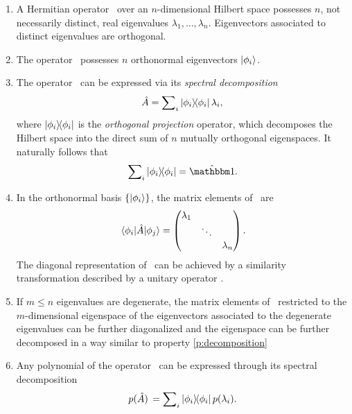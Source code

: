             \begin{enumerate}[label = \textit{\roman{enumi}}.]
                \item A Hermitian operator \hA\ over an $n$-dimensional Hilbert space possesses $n$, not necessarily distinct, real eigenvalues $\lambda_1,\ldots,\lambda_n$. Eigenvectors associated to distinct eigenvalues are orthogonal.
                \item The operator \hA\ possesses $n$ orthonormal eigenvectors $\ket{\phi_i}$.
                \item The operator \hA\ can be expressed via its \emph{spectral decomposition}
                    \begin{equation}
                        \label{eq:spectral-decomposition}
                        \hA = \sum\nolimits_i \dyad{\phi_i}{\phi_i}\lambda_i
                        \mycomma
                    \end{equation}
                    where $\dyad{\phi_i}{\phi_i}$ is the \emph{orthogonal projection} operator, which decomposes the Hilbert space into the direct sum of $n$ mutually orthogonal eigenspaces. It naturally follows that
                    \begin{equation}
                        \label{eq:completeness-of-identity}
                        \sum\nolimits_i \dyad{\phi_i}{\phi_i} = \hidM
                        \myperiod
                    \end{equation}
                    \label{p:decomposition}
                \item In the orthonormal basis $\qty{\ket{\phi_i}}$, the matrix elements of \hA\ are
                    \begin{equation*}
                        \mel{\phi_i}{\hA}{\phi_j} = \pmqty{\dmat{\lambda_1,\ddots,\lambda_n}}
                        \myperiod
                    \end{equation*}
                    The diagonal representation of \hA\ can be achieved by a similarity transformation described by a unitary operator \hU.
                \item If $m \leq n$ eigenvalues are degenerate, the matrix elements of \hA\ restricted to the $m$-dimensional eigenspace of the eigenvectors associated to the degenerate eigenvalues can be further diagonalized and the eigenspace can be further decomposed in a way similar to property \ref{p:decomposition}
                \item Any polynomial of the operator \hA\ can be expressed through its spectral decomposition
                    \begin{equation}
                        \label{eq:polynomial-of-operator}
                        p\pqty*{\hA} = \sum\nolimits_i \dyad{\phi_i}{\phi_i} p\pqty{\lambda_i}
                        \myperiod
                    \end{equation}
            \end{enumerate}
